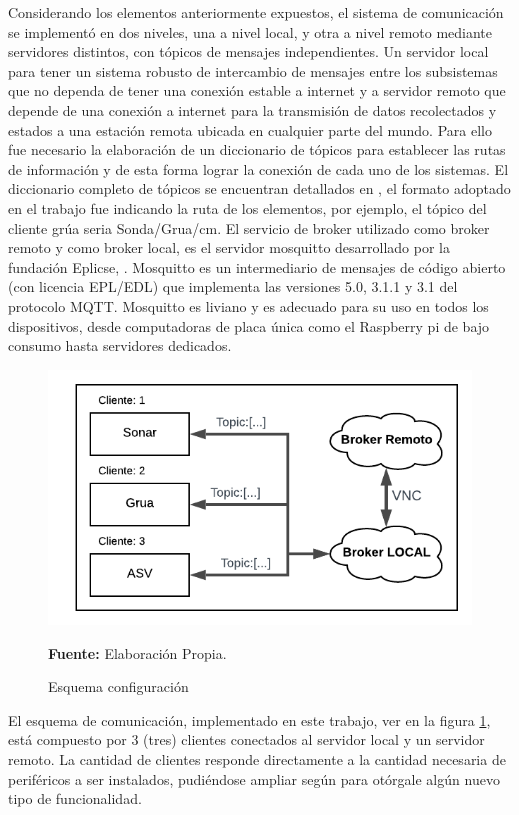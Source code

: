 Considerando los elementos anteriormente expuestos, el sistema de comunicación se implementó en dos niveles, una a nivel local, y otra a nivel remoto mediante servidores distintos, con t\'opicos de mensajes independientes. 
Un servidor local para tener un sistema robusto de intercambio de mensajes entre los subsistemas que no dependa de tener una conexi\'on estable a internet y a servidor remoto que depende de una conexi\'on a internet para la transmisi\'on de datos recolectados y estados a una estación remota ubicada en cualquier parte del mundo. 
Para ello fue necesario la elaboraci\'on de un diccionario de t\'opicos para establecer las rutas de informaci\'on y de esta forma lograr la conexi\'on de cada uno de los sistemas. 
El diccionario completo de t\'opicos se encuentran detallados en 
, el formato adoptado en el trabajo fue indicando la ruta de los elementos, por ejemplo, el tópico del cliente gr\'ua seria Sonda/Grua/cm.
El servicio de broker utilizado como broker remoto y como broker local, es el servidor mosquitto desarrollado por la fundaci\'on Eplicse, \cite{mosquitto_eclipse_2018}. Mosquitto es un intermediario de mensajes de código abierto (con licencia EPL/EDL) que implementa las versiones 5.0, 3.1.1 y 3.1 del protocolo MQTT. Mosquitto es liviano y es adecuado para su uso en todos los dispositivos, desde computadoras de placa única como el Raspberry pi de bajo consumo hasta servidores dedicados.
\begin{figure}[ht]
        \centering
        \includegraphics[scale=0.6]{Imagenes/cap3/esquemaCom.png}
        \caption[ Esquema configuraci\'on mqtt]{Esquema configuraci\'on}\textbf{Fuente:} Elaboración Propia.
        \label{fig:mqttUtil}
    \end{figure}
El esquema de comunicaci\'on, implementado en este trabajo, ver en la figura \ref{fig:mqttUtil}, est\'a compuesto por 3 (tres) clientes conectados al servidor local y un servidor remoto. La cantidad de clientes responde directamente a la cantidad necesaria de perif\'ericos a ser instalados, pudi\'endose ampliar seg\'un para ot\'orgale alg\'un nuevo tipo de funcionalidad. 

